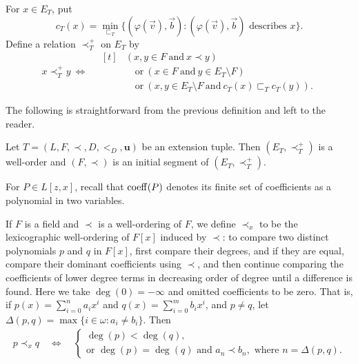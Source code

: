 \begin{definition}
For $x\in E_T$, put
\[
 c_T(x)=\min_{\sqsubset_T}
       \{(\varphi(\vec v),\vec b):
              (\varphi(\vec v),\vec b)\text{ describes }x\}.
\]
Define a relation $\prec_T^+$ on $E_T$ by
\begin{equation}
 x\prec_T^+y\ \Longleftrightarrow\quad
 \begin{aligned}[t]
 &(x,y\in F\ \text{and}\ x\prec y)\\
 &\quad\text{or}\ (x\in F\ \text{and}\ y\in E_T\setminus F)\\
 &\quad\text{or}\ (x,y\in E_T\setminus F\ \text{and}\ c_T(x)\sqsubset_T c_T(y)).
 \end{aligned}
\end{equation}
\end{definition}

The following is straightforward from the previous definition and left to the reader.

\begin{lemma}\label{lem:orderExtension}
Let $T=(L,F,\prec,D,<_D,\mathbf u)$ be an extension tuple.
Then $(E_T,\prec_T^+)$ is a well-order and $(F,\prec)$ is an initial segment of $(E_T,\prec_T^+)$.
\end{lemma}

For $P\in L[z,x]$, recall that $\operatorname{coeff}(P)$ denotes its finite set of coefficients
as a polynomial in two variables.

If $F$ is a field and $\prec$ is a well-ordering of $F$, we define $\prec_x$ to be the lexicographic well-ordering of $F[x]$ induced by $\prec$: to compare two distinct polynomials $p$ and $q$ in $F[x]$, first compare their degrees, and if they are equal, compare their dominant coefficients using $\prec$, and then continue comparing the coefficients of lower degree terms in decreasing order of degree until a difference is found.
Here we take $\deg(0)=-\infty$ and omitted coefficients to be zero.
That is, if $p(x)=\sum_{i=0}^n a_ix^i$ and $q(x)=\sum_{i=0}^m b_ix^i$, and $p\neq q$, let $\Delta(p,q)=\max\{i\in\omega:a_i\neq b_i\}$.
Then
\begin{align*}
    p\prec_x q\quad\Longleftrightarrow\quad
    \begin{cases}
        \deg(p)<\deg(q),\\
        \text{or } \deg(p)=\deg(q) \text{ and } a_n\prec b_n, \text{ where } n=\Delta(p,q).
    \end{cases}
\end{align*}

